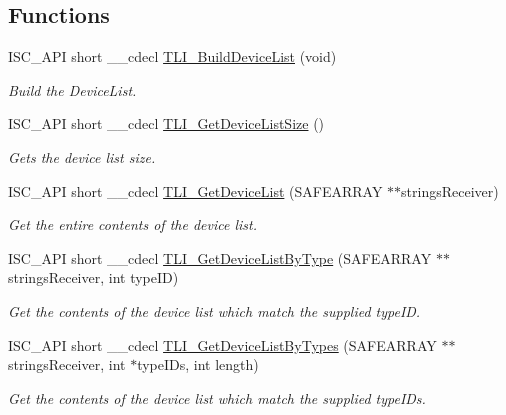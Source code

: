 \subsection*{Functions}
\begin{DoxyCompactItemize}
\item 
I\+S\+C\+\_\+\+A\+PI short \+\_\+\+\_\+cdecl \hyperlink{group___integrated_stepper_motors_ga8e59a0f0c973d578bb2a1aeefb1f170d}{T\+L\+I\+\_\+\+Build\+Device\+List} (void)
\begin{DoxyCompactList}\small\item\em Build the Device\+List. \end{DoxyCompactList}\item 
I\+S\+C\+\_\+\+A\+PI short \+\_\+\+\_\+cdecl \hyperlink{group___integrated_stepper_motors_gaf236a976b8a13fcb8aa4475f7cad42ef}{T\+L\+I\+\_\+\+Get\+Device\+List\+Size} ()
\begin{DoxyCompactList}\small\item\em Gets the device list size. \end{DoxyCompactList}\item 
I\+S\+C\+\_\+\+A\+PI short \+\_\+\+\_\+cdecl \hyperlink{group___integrated_stepper_motors_ga82c379129ff1d06b53ce230e331e4205}{T\+L\+I\+\_\+\+Get\+Device\+List} (S\+A\+F\+E\+A\+R\+R\+AY $\ast$$\ast$strings\+Receiver)
\begin{DoxyCompactList}\small\item\em Get the entire contents of the device list. \end{DoxyCompactList}\item 
I\+S\+C\+\_\+\+A\+PI short \+\_\+\+\_\+cdecl \hyperlink{group___integrated_stepper_motors_gae1b382c43afab1b36a21778de5278bb0}{T\+L\+I\+\_\+\+Get\+Device\+List\+By\+Type} (S\+A\+F\+E\+A\+R\+R\+AY $\ast$$\ast$strings\+Receiver, int type\+ID)
\begin{DoxyCompactList}\small\item\em Get the contents of the device list which match the supplied type\+ID. \end{DoxyCompactList}\item 
I\+S\+C\+\_\+\+A\+PI short \+\_\+\+\_\+cdecl \hyperlink{group___integrated_stepper_motors_gae038dc4261f87262ea4ea7003f354179}{T\+L\+I\+\_\+\+Get\+Device\+List\+By\+Types} (S\+A\+F\+E\+A\+R\+R\+AY $\ast$$\ast$strings\+Receiver, int $\ast$type\+I\+Ds, int length)
\begin{DoxyCompactList}\small\item\em Get the contents of the device list which match the supplied type\+I\+Ds. \end{DoxyCompactList}\item 
$$
\end{DoxyCompactItemize}

